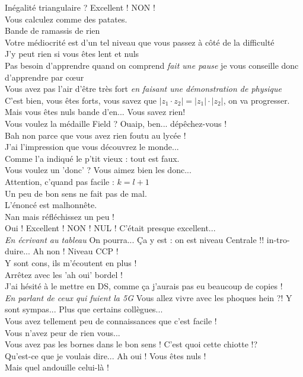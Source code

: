 \documentclass[french, a4paper, openany]{book}
\begin{document}
	\og Inégalité triangulaire ? Excellent ! NON ! \fg \\
	\og Vous calculez comme des patates. \fg \\
	\og Bande de ramassis de rien \fg \\
	\og Votre médiocrité est d'un tel niveau que vous passez à côté de la difficulté \fg \\
	\og J'y peut rien si vous êtes lent et nuls \fg \\
	\og Pas besoin d'apprendre quand on comprend \emph{fait une pause} je vous conseille donc d'apprendre par cœur \fg \\
	\og Vous avez pas l'air d'être très fort \fg \emph{en faisant une démonstration de physique} \\
	\og C'est bien, vous êtes forts, vous savez que $\lvert z_1 \cdot z_2 \rvert = \lvert z_1 \rvert \cdot \lvert z_2 \rvert$, on va progresser. Mais vous êtes nuls bande d'en... Vous savez rien! \fg \\
	\og Vous voulez la médaille Field ? Ouaip, ben... dépêchez-vous ! \fg \\
	\og Bah non parce que vous avez rien foutu au lycée ! \fg \\
	\og J'ai l'impression que vous découvrez le monde... \fg \\
	\og Comme l'a indiqué le p'tit vieux : tout est faux. \fg \\
	\og Vous voulez un 'donc' ? Vous aimez bien les donc... \fg \\
	\og Attention, c'quand pas facile : $k = l+ 1$ \fg \\
	\og Un peu de bon sens ne fait pas de mal. \fg \\
	\og L'énoncé est malhonnête. \fg \\
	\og Nan mais réfléchissez un peu ! \fg \\
	\og Oui ! Excellent ! NON ! NUL ! C'était presque excellent... \fg \\
	\emph{En écrivant au tableau} \og On pourra... Ça y est : on est niveau Centrale !! in-tro-duire... Ah non ! Niveau CCP ! \fg \\
	\og Y sont cons, ils m'écoutent en plus ! \fg \\
	\og Arrêtez avec les 'ah oui' bordel ! \fg \\
	\og J'ai hésité à le mettre en DS, comme ça j'aurais pas eu beaucoup de copies !\fg \\
	\emph{En parlant de ceux qui fuient la 5G} \og Vous allez vivre avec les phoques hein ?! Y sont sympas... Plus que certains collègues... \fg \\
	\og Vous avez tellement peu de connaissances que c'est facile ! \fg \\
	\og Vous n'avez peur de rien vous... \fg \\	
	\og Vous avez pas les bornes dans le bon sens ! C'est quoi cette chiotte !? \fg \\
	\og Qu'est-ce que je voulais dire... Ah oui ! Vous êtes nuls ! \fg \\
	\og Mais quel andouille celui-là ! \fg \\
	
\end{document}
